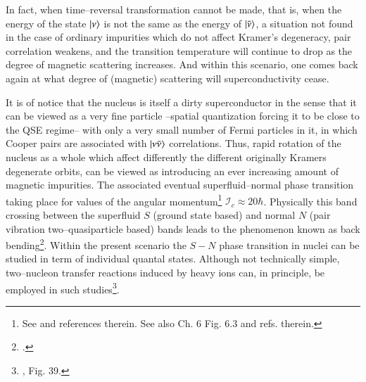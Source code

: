 \begin{subappendices}
 
 In fact,  when time--reversal transformation cannot be made, that is, when the energy of the state $|{\nu} \rangle$ is not the same as the energy of $|{\bar\nu} \rangle$, a situation not found in the case of ordinary impurities which do not affect Kramer's degeneracy, pair correlation weakens, and the transition temperature will continue to drop as the degree of magnetic scattering increases. And within this scenario, one comes back again at what degree of (magnetic) scattering will superconductivity cease.
 
 
 It is of notice that the nucleus is itself a dirty superconductor in the sense that it can be viewed as a very fine particle --spatial quantization forcing it to be close to the QSE regime-- with only a very small number of Fermi particles in it, in which Cooper pairs are associated with $|{\nu\bar\nu} \rangle$ correlations. Thus, rapid rotation of the nucleus as a whole which affect differently the different originally Kramers degenerate orbits, can be viewed as introducing an ever increasing amount of magnetic impurities. The associated eventual superfluid--normal phase transition taking place for values of the angular momentum\footnote{See \cite{Bohr:75} and references therein. See also \cite{Brink:05} Ch. 6 Fig. 6.3 and refs. therein.} $\mathcal I_c\approx20\hbar$. Physically this band crossing between the superfluid $S$ (ground state based) and normal $N$ (pair vibration two--quasiparticle based) bands leads to the phenomenon known as back bending\footnote{\cite{Bohr:75,Stephens:72,Johnson:72}.}. Within the present scenario the $S-N$ phase transition in nuclei can be studied in term of individual quantal states. Although not  technically simple, two--nucleon transfer reactions induced by heavy ions can, in principle, be employed in such studies\footnote{\cite{Broglia:86,Shimizu:89}, Fig. 39.}.
\begin{figure}

\end{figure}
\end{subappendices}
